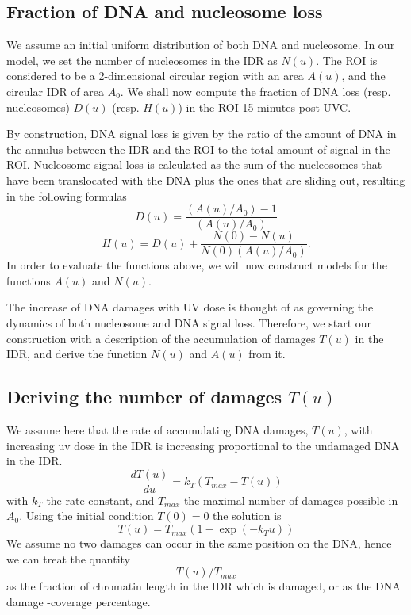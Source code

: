 \documentclass[12pt]{article}
\begin{document}
\subsection{Fraction of DNA and nucleosome loss }\label{subsection:fractionOfDNAandNucleosomeLoss}
We assume an initial uniform distribution of both DNA and nucleosome. 
In our model, we set the number of nucleosomes in the IDR as $N(u)$. The ROI is considered to be a 2-dimensional circular region with an area $A(u)$, and the circular IDR of area $A_0$. 
We shall now compute the fraction of DNA loss (resp. nucleosomes) $D(u)$ (resp. $H(u)$) in the ROI 15 minutes post UVC. 

By construction, DNA signal loss is given by the ratio of the amount of DNA in the annulus between the IDR and the ROI to the total amount of signal in the ROI. Nucleosome signal loss is calculated as the sum of the nucleosomes that have been translocated with the DNA plus the ones that are sliding out, resulting in the following formulas
\begin{equation}\label{eq:DNAStSt}
D(u)= \frac{(A(u)/A_0) -1}{(A(u)/A_0)}
\end{equation}
\begin{equation}
\label{eq:histoneStSt}
H(u)=D(u)+\frac{N(0)-N(u)}{N(0)(A(u)/A_0)}.
\end{equation}
In order to evaluate the functions above, we will now construct models for the functions $A(u)$ and $N(u)$.

The increase of DNA damages with UV dose is thought of as governing the dynamics of both nucleosome and DNA signal loss. Therefore, we start our construction with a description of the accumulation of damages $T(u)$ in the IDR, and derive the function $N(u)$ and $A(u)$ from it.

\subsection{Deriving the number of damages $T(u)$}
We assume here that the rate of accumulating DNA damages, $T(u)$, with increasing uv dose in the IDR is increasing proportional to the undamaged DNA in the IDR.
\begin{equation}
\frac{dT(u)}{du}=k_T\left(T_{max}-T(u)\right)
\end{equation}
with $k_T$ the rate constant, and $T_{max}$ the maximal number of damages possible in $A_0$. 
Using the initial condition $T(0) = 0$ the solution is
\begin{equation}
T(u) = T_{max}\left(1-\exp(-k_T u)\right) 
\end{equation}
We assume no two damages can occur in the same position on the DNA, hence we can treat the quantity 
\begin{equation*}
T(u)/T_{max}
\end{equation*}
as the fraction of chromatin length in the IDR which is damaged, or as the DNA damage -coverage percentage. 
\end{document}
